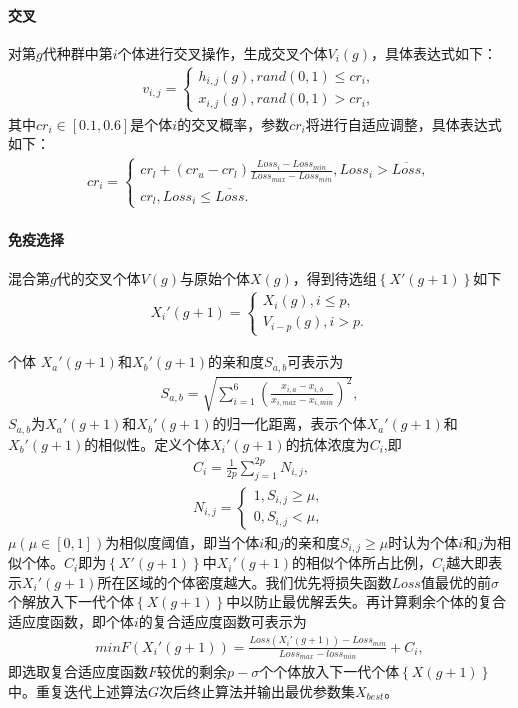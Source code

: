 \documentclass{whutmod}
\begin{document}
		\paragraph{交叉}
		对第$g$代种群中第$i$个体进行交叉操作，生成交叉个体$V_i(g)$，具体表达式如下：
		\begin{gather}
		v_{i,j}=\left\{\begin{matrix}h_{i,j}(g),rand(0,1)\leq cr_{i},
		\\ x_{i,j}(g),rand(0,1)>cr_{i},
		\end{matrix}\right.
		\end{gather}
		其中$cr_{i}\in[0.1,0.6]$是个体$i$的交叉概率，参数$cr_{i}$将进行自适应调整，具体表达式如下：
		\begin{gather}
		cr_{i}=\left\{\begin{matrix}cr_{l}+(cr_{u}-cr_{l})\frac{Loss_{i}-Loss_{min}}{Loss_{max}-Loss_{min}} , Loss_{i}>\overline{Loss},
		\\ cr_{l},Loss_{i}\leqslant  \overline{Loss}.
		\end{matrix}\right.
		\end{gather}
		\paragraph{免疫选择}
		混合第$g$代的交叉个体$V(g)$与原始个体$X(g)$，得到待选组$\left \{ X '(g+1)\right \}$如下
		\begin{gather*}
		X_i '(g+1)=\left\{\begin{matrix}  X_i (g),i\leqslant p,
		\\  V_{i-p} (g),i>p.
		\end{matrix}\right.
		\end{gather*}
		
		个体 $X_a '(g+1)$和$X_b '(g+1)$的亲和度$S_{a,b}$可表示为
		\begin{gather}
		S_{a,b}=\sqrt{\sum _{i=1}^6( \frac{x_{i,a}-x_{i,b}}{x_{i,max}-x_{i,min}})^2},
		\end{gather}
		$S_{a,b}$为$X_a '(g+1)$和$X_b '(g+1)$的归一化距离，表示个体$X_a '(g+1)$和$X_b '(g+1)$的相似性。定义个体$X_i '(g+1)$的抗体浓度为$C_{i}$,即
		\begin{gather*}
		C_{i}=\frac{1}{2p}\sum _{j=1}^{2p} N_{i,j},\\
		N_{i,j}=\left\{\begin{matrix}1,S_{i,j}\geqslant \mu ,
		\\ 0,S_{i,j}< \mu ,
		\end{matrix}\right.
		\end{gather*}
		$\mu(\mu\in[0,1])$为相似度阈值，即当个体$i$和$j$的亲和度$S_{i,j}\geqslant \mu$时认为个体$i$和$j$为相似个体。$C_{i}$即为$\left \{ X '(g+1)\right \}$中$X_i '(g+1)$的相似个体所占比例，$C_{i}$越大即表示$X_i '(g+1)$所在区域的个体密度越大。我们优先将损失函数$Loss$值最优的前$\sigma$个解放入下一代个体$\left \{ X(g+1)\right \}$中以防止最优解丢失。再计算剩余个体的复合适应度函数，即个体$i$的复合适应度函数可表示为
		\begin{gather}
		min F(X_i '(g+1))=\frac{Loss(X_i '(g+1))-Loss_{min}}{Loss_{max}-loss_{min}}+C_{i},
		\end{gather}
		即选取复合适应度函数$F$较优的剩余$p-\sigma$个个体放入下一代个体$\left \{ X(g+1)\right \}$中。重复迭代上述算法$G$次后终止算法并输出最优参数集$X_{best}$。
\end{document}
